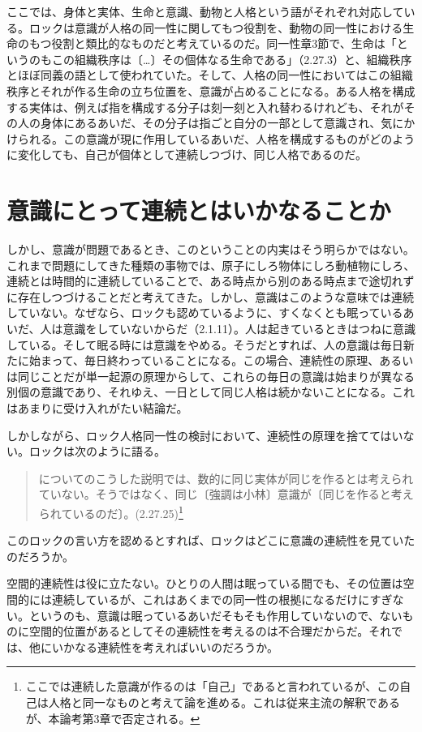 \documentclass[a4j,oneside]{jsbook}
\begin{document}
ここでは、身体と実体、生命と意識、動物と人格という語がそれぞれ対応している。ロックは意識が人格の同一性に関してもつ役割を、動物の同一性における生命のもつ役割と類比的なものだと考えているのだ。同一性章3節で、生命は「というのもこの組織秩序は〔…〕その個体なる生命である」（2.27.3）と、組織秩序とほぼ同義の語として使われていた。そして、人格の同一性においてはこの組織秩序とそれが作る生命の立ち位置を、意識が占めることになる。ある人格を構成する実体は、例えば指を構成する分子は刻一刻と入れ替わるけれども、それがその人の身体にあるあいだ、その分子は指ごと自分の一部として意識され、気にかけられる。この意識が現に作用しているあいだ、人格を構成するものがどのように変化しても、自己が個体として連続しつづけ、同じ人格であるのだ。
\section{
意識にとって連続とはいかなることか
}
しかし、意識が問題であるとき、このということの内実はそう明らかではない。これまで問題にしてきた種類の事物では、原子にしろ物体にしろ動植物にしろ、連続とは時間的に連続していることで、ある時点から別のある時点まで途切れずに存在しつづけることだと考えてきた。しかし、意識はこのような意味では連続していない。なぜなら、ロックも認めているように、すくなくとも眠っているあいだ、人は意識をしていないからだ（2.1.11）。人は起きているときはつねに意識している。そして眠る時には意識をやめる。そうだとすれば、人の意識は毎日新たに始まって、毎日終わっていることになる。この場合、連続性の原理、あるいは同じことだが単一起源の原理からして、これらの毎日の意識は始まりが異なる別個の意識であり、それゆえ、一日として同じ人格は続かないことになる。これはあまりに受け入れがたい結論だ。
\par
しかしながら、ロック人格同一性の検討において、連続性の原理を捨ててはいない。ロックは次のように語る。
\begin{quote}
についてのこうした説明では、数的に同じ実体が同じを作るとは考えられていない。そうではなく、同じ〔強調は小林〕意識が〔同じを作ると考えられているのだ〕。(2.27.25)\footnote{ここでは連続した意識が作るのは「自己」であると言われているが、この自己は人格と同一なものと考えて論を進める。これは従来主流の解釈であるが、本論考第3章で否定される。}
\end{quote}
このロックの言い方を認めるとすれば、ロックはどこに意識の連続性を見ていたのだろうか。
\par
空間的連続性は役に立たない。ひとりの人間は眠っている間でも、その位置は空間的には連続しているが、これはあくまでの同一性の根拠になるだけにすぎない。というのも、意識は眠っているあいだそもそも作用していないので、ないものに空間的位置があるとしてその連続性を考えるのは不合理だからだ。それでは、他にいかなる連続性を考えればいいのだろうか。
\end{document}

